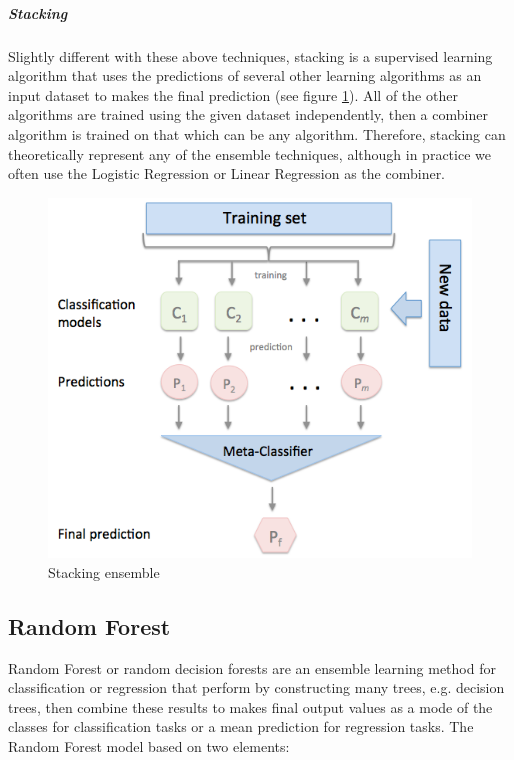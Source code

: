 \subparagraph{Stacking}

Slightly different with these above techniques, stacking is a supervised learning algorithm that uses the predictions of several other learning algorithms as an input dataset to makes the final prediction (see figure \ref{img:stacking_ensemble}). All of the other algorithms are trained using the given dataset independently, then a combiner algorithm is trained on that which can be any algorithm. Therefore, stacking can theoretically represent any of the ensemble techniques, although in practice we often use the Logistic Regression or Linear Regression as the combiner.


\begin{figure}
\includegraphics[scale=0.4]{Images/stacking.png}
\centering
\caption{Stacking ensemble \citep{raschka2015python}}
\label{img:stacking_ensemble}
\end{figure}


\subsection*{Random Forest}

Random Forest \citep{breiman2001random} or random decision forests \citep{ho1995random, ho1998random} are an ensemble learning method for classification or regression that perform by constructing many trees, e.g. decision trees, then combine these results to makes final output values as a mode of the classes for classification tasks or a mean prediction for regression tasks. The Random Forest model based on two elements:


